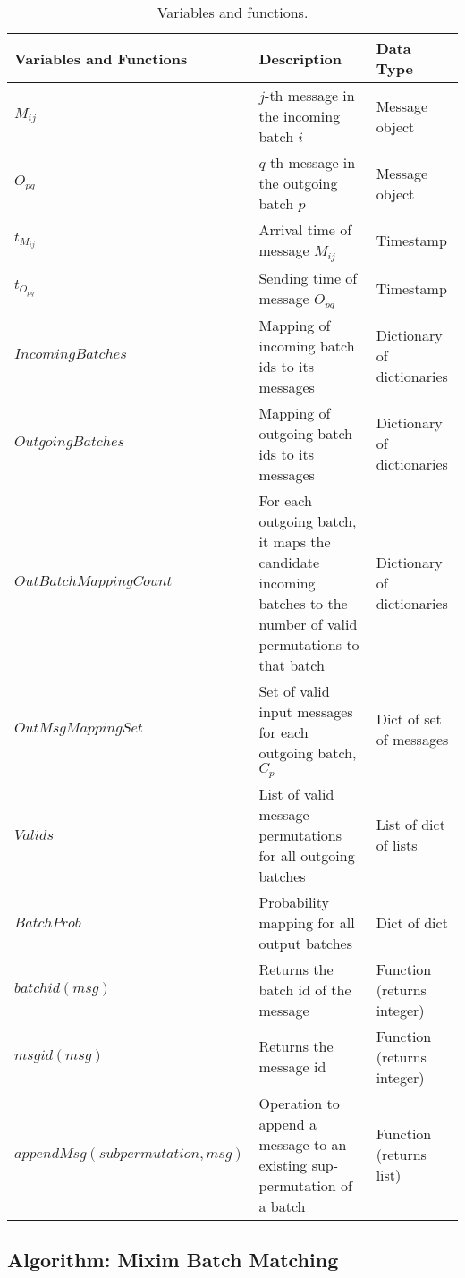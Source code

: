 \documentclass[twocolumn]{article}
\begin{document}
\vspace{1em} 
\begin{table*}[!t]
\centering\small
\begin{tabular}{l p{6cm} p{6cm}}
\hline
\textbf{Variables and Functions} & \textbf{Description} & \textbf{Data Type} \\
\hline
$M_{ij}$      & $j$-th message in the incoming batch $i$ & Message object\\
$O_{pq}$      & $q$-th message in the outgoing batch $p$ & Message object\\
$t_{M_{ij}}$  & Arrival time of message $M_{ij}$ & Timestamp  \\
$t_{O_{pq}}$  & Sending time of message $O_{pq}$ & Timestamp  \\
$IncomingBatches$ & Mapping of incoming batch ids to its messages & Dictionary of dictionaries \\
$OutgoingBatches$ & Mapping of outgoing batch ids to its messages & Dictionary of dictionaries \\
$OutBatchMappingCount$ & For each outgoing batch, it maps the candidate incoming batches to the number of valid permutations to that batch & Dictionary of dictionaries \\
$OutMsgMappingSet$ & Set of valid input messages for each outgoing batch, $C_{p}$ & Dict of set of messages \\
$Valids$      & List of valid message permutations for all outgoing batches & List of dict of lists  \\
$BatchProb$ & Probability mapping for all output batches & Dict of dict \\
$batchid(msg)$ & Returns the batch id of the message  & Function (returns integer) \\
$msgid(msg)$   & Returns the message id  & Function (returns integer) \\
$appendMsg(subpermutation, msg)$  & Operation to append a message to an existing sup-permutation of a batch  & Function (returns list) \\
\hline
\end{tabular}
\caption{Variables and functions.} %
\end{table*}
\vspace{1em} 

\subsection{Algorithm: Mixim Batch Matching}
\vspace{0.5em}
\end{document}
